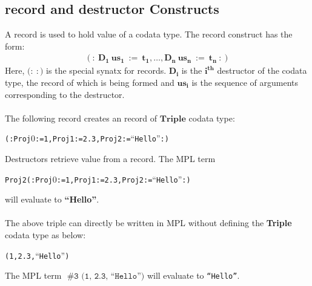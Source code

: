 \documentclass[11pt]{article}
\begin{document}
\subsection {record and destructor Constructs}
A {\sf record} is used to hold value of a codata type. The {\sf record} construct has the form:
  \begin{align*}
    \mathbf{(:~D_1~us_1~:=~t_1,\ldots,D_n~us_n~:=~t_n~:)}
  \end{align*}
Here, $\mathbf(:~:)$ is the special synatx for records. $\mathbf{D_i}$ is the $\mathbf{i^{th}}$ destructor of the codata type, the record of which is being formed and $\mathbf{us_i}$ is the sequence of arguments corresponding to the destructor.
~~\\~~\\
The following record creates an record of $\mathbf{Triple}$ codata type:
\begin{alltt}
              (: Proj\(0\) := 1 , Proj1 := 2.3 , Proj2 := ``Hello'' :)
\end{alltt}
{\sf Destructors} retrieve value from a record. The MPL term 
\begin{alltt}
              Proj2 (: Proj\(0\) := 1 , Proj1 := 2.3 , Proj2 := ``Hello'' :)
\end{alltt}
will evaluate to {\bf ``Hello''}.
~~\\~~\\ 
The above triple can directly be written in MPL without defining the {\bf Triple} codata type as below:
\begin{alltt}
              (1, 2.3, ``Hello'')
\end{alltt}
The MPL term $\mathbf{\texttt{~\#3~(1,~2.3,~``Hello'')}}$ will evaluate to \texttt{``Hello''}.
\end{document}
